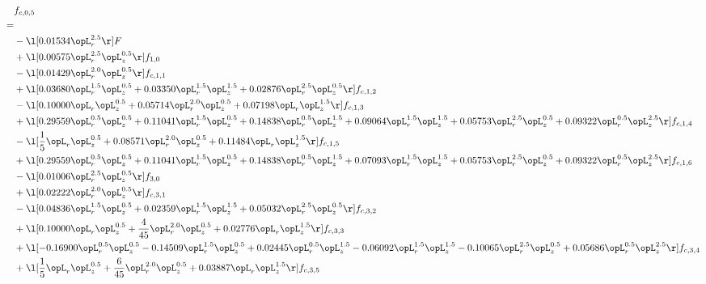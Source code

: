 \begin{alignat}{2} 
\label{eq:f_05_2} 
& f_{c,0,5} \nonumber \\ 
 = \\ 
& - \l[  0.01534 \opL_r^{2.5}  \r] F \nonumber \\ 
& + \l[  0.00575 \opL_r^{2.5} \opL_z^{0.5}  \r] f_{1,0} \nonumber \\ 
& - \l[  0.01429 \opL_r^{2.0} \opL_z^{0.5}  \r] f_{c,1,1} \nonumber \\ 
& + \l[  0.03680 \opL_r^{1.5} \opL_z^{0.5} +  0.03350 \opL_r^{1.5} \opL_z^{1.5} +  0.02876 \opL_r^{2.5} \opL_z^{0.5}  \r] f_{c,1,2} \nonumber \\ 
& - \l[  0.10000 \opL_r \opL_z^{0.5} +  0.05714 \opL_r^{2.0} \opL_z^{0.5} +  0.07198 \opL_r \opL_z^{1.5}  \r] f_{c,1,3} \nonumber \\ 
& + \l[  0.29559 \opL_r^{0.5} \opL_z^{0.5} +  0.11041 \opL_r^{1.5} \opL_z^{0.5} +  0.14838 \opL_r^{0.5} \opL_z^{1.5} +  0.09064 \opL_r^{1.5} \opL_z^{1.5} +  0.05753 \opL_r^{2.5} \opL_z^{0.5} +  0.09322 \opL_r^{0.5} \opL_z^{2.5}  \r] f_{c,1,4} \nonumber \\ 
& - \l[ \frac{1}{5} \opL_r \opL_z^{0.5} +  0.08571 \opL_r^{2.0} \opL_z^{0.5} +  0.11484 \opL_r \opL_z^{1.5}  \r] f_{c,1,5} \nonumber \\ 
& + \l[  0.29559 \opL_r^{0.5} \opL_z^{0.5} +  0.11041 \opL_r^{1.5} \opL_z^{0.5} +  0.14838 \opL_r^{0.5} \opL_z^{1.5} +  0.07093 \opL_r^{1.5} \opL_z^{1.5} +  0.05753 \opL_r^{2.5} \opL_z^{0.5} +  0.09322 \opL_r^{0.5} \opL_z^{2.5}  \r] f_{c,1,6} \nonumber \\ 
& - \l[  0.01006 \opL_r^{2.5} \opL_z^{0.5}  \r] f_{3,0} \nonumber \\ 
& + \l[  0.02222 \opL_r^{2.0} \opL_z^{0.5}  \r] f_{c,3,1} \nonumber \\ 
& - \l[  0.04836 \opL_r^{1.5} \opL_z^{0.5} +  0.02359 \opL_r^{1.5} \opL_z^{1.5} +  0.05032 \opL_r^{2.5} \opL_z^{0.5}  \r] f_{c,3,2} \nonumber \\ 
& + \l[  0.10000 \opL_r \opL_z^{0.5} + \frac{4}{45} \opL_r^{2.0} \opL_z^{0.5} +  0.02776 \opL_r \opL_z^{1.5}  \r] f_{c,3,3} \nonumber \\ 
& + \l[  -0.16900 \opL_r^{0.5} \opL_z^{0.5}   -0.14509 \opL_r^{1.5} \opL_z^{0.5} +  0.02445 \opL_r^{0.5} \opL_z^{1.5}   -0.06092 \opL_r^{1.5} \opL_z^{1.5}   -0.10065 \opL_r^{2.5} \opL_z^{0.5} +  0.05686 \opL_r^{0.5} \opL_z^{2.5}  \r] f_{c,3,4} \nonumber \\ 
& + \l[ \frac{1}{5} \opL_r \opL_z^{0.5} + \frac{6}{45} \opL_r^{2.0} \opL_z^{0.5} +  0.03887 \opL_r \opL_z^{1.5}  \r] f_{c,3,5} \nonumber \\ 

\end{alignat}
